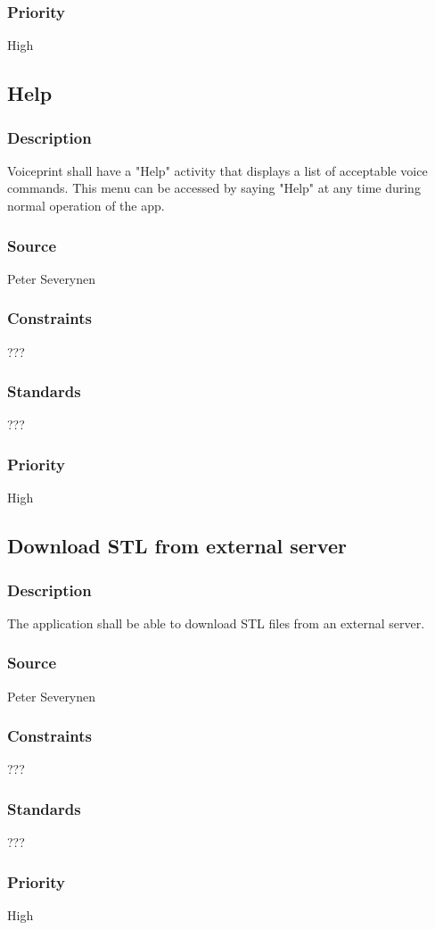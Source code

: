 \subsubsection{Priority}
High
\subsection{Help}
\subsubsection{Description}
Voiceprint shall have a "Help" activity that displays a list of acceptable voice commands. This menu can be accessed by saying "Help" at any time during normal operation of the app.
\subsubsection{Source}
Peter Severynen
\subsubsection{Constraints}
???
\subsubsection{Standards}
???
\subsubsection{Priority}
High
\subsection{Download STL from external server}
\subsubsection{Description}
The application shall be able to download STL files from an external server.
\subsubsection{Source}
Peter Severynen
\subsubsection{Constraints}
???
\subsubsection{Standards}
???
\subsubsection{Priority}
High
